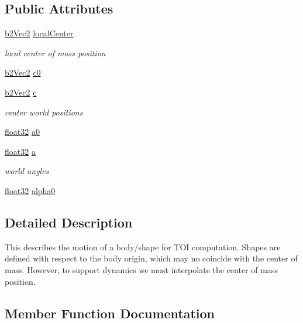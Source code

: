\subsection*{Public Attributes}
\begin{DoxyCompactItemize}
\item 
\mbox{\hyperlink{structb2_vec2}{b2\+Vec2}} \mbox{\hyperlink{structb2_sweep_a4bcc302cf78771896d6256fc53f2f8be}{local\+Center}}
\begin{DoxyCompactList}\small\item\em local center of mass position \end{DoxyCompactList}\item 
\mbox{\hyperlink{structb2_vec2}{b2\+Vec2}} \mbox{\hyperlink{structb2_sweep_a16dacd7188f3c7b2adef3242012587d8}{c0}}
\item 
\mbox{\hyperlink{structb2_vec2}{b2\+Vec2}} \mbox{\hyperlink{structb2_sweep_a1b5402e01b92cc82473389fc6f0375c3}{c}}
\begin{DoxyCompactList}\small\item\em center world positions \end{DoxyCompactList}\item 
\mbox{\hyperlink{b2_settings_8h_aacdc525d6f7bddb3ae95d5c311bd06a1}{float32}} \mbox{\hyperlink{structb2_sweep_acf89c7d1223f8ab27501ff033aeac92b}{a0}}
\item 
\mbox{\hyperlink{b2_settings_8h_aacdc525d6f7bddb3ae95d5c311bd06a1}{float32}} \mbox{\hyperlink{structb2_sweep_afa96bacc91dd3c92ae716a45512332d6}{a}}
\begin{DoxyCompactList}\small\item\em world angles \end{DoxyCompactList}\item 
\mbox{\hyperlink{b2_settings_8h_aacdc525d6f7bddb3ae95d5c311bd06a1}{float32}} \mbox{\hyperlink{structb2_sweep_aa5f8ab90178b58bc0777096cbc6b91cf}{alpha0}}
\end{DoxyCompactItemize}


\subsection{Detailed Description}
This describes the motion of a body/shape for T\+OI computation. Shapes are defined with respect to the body origin, which may no coincide with the center of mass. However, to support dynamics we must interpolate the center of mass position. 

\subsection{Member Function Documentation}
\mbox{\label{structb2_sweep_a35eb9b976ca87c9b8d758bec070c6c06}} 
